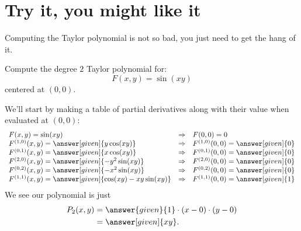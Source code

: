 \documentclass{ximera}
\begin{document}
\section{Try it, you might like it}

Computing the Taylor polynomial is not so bad, you just need to get the hang of it. 

\begin{example}
  Compute the degree $2$ Taylor polynomial for:
  \[
  F(x,y)=\sin(xy)
  \]
  centered at $(0,0)$.
  \begin{explanation}
    We'll start by making a table of partial derivatives along with
    their value when evaluated at $(0,0)$:
    \[
    \begin{array}{lcl}
      F(x,y) = \sin(xy) & \Rightarrow &F(0,0) = 0\\
      F^{(1,0)}(x,y) = \answer[given]{y\cos(xy)} & \Rightarrow & F^{(1,0)}(0,0) = \answer[given]{0}\\
      F^{(0,1)}(x,y) = \answer[given]{x\cos(xy)} &\Rightarrow  & F^{(0,1)}(0,0) = \answer[given]{0}\\
      F^{(2,0)}(x,y) = \answer[given]{-y^2\sin(xy)} &\Rightarrow & F^{(2,0)}(0,0) = \answer[given]{0}\\
      F^{(0,2)}(x,y) = \answer[given]{-x^2\sin(xy)} &\Rightarrow & F^{(0,2)}(0,0) = \answer[given]{0}\\
      F^{(1,1)}(x,y) = \answer[given]{\cos(xy)-xy\sin(xy)} &\Rightarrow & F^{(1,1)}(0,0) = \answer[given]{1}
    \end{array}
    \]
    We see our polynomial is just
    \begin{align*}
      P_2(x,y) &= \answer{given}{1}\cdot (x-0)\cdot (y-0)\\
      &= \answer[given]{xy}.
    \end{align*}
  \end{explanation}
\end{example}
\end{document}
